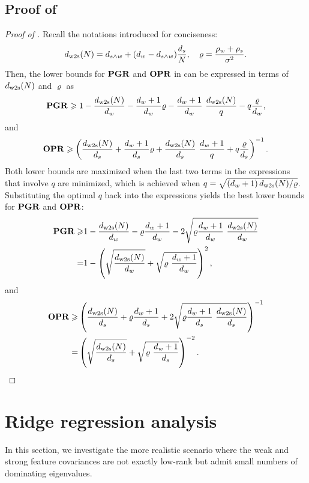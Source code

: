 \subsection{Proof of }\label{apx:pf_non_monotonic_scaling}
\begin{proof}[Proof of ]
    Recall the notations introduced for conciseness:
    \begin{align*}
        d_{\mathrm{w2s}}(N) = d_{s \wedge w} + (d_w - d_{s \wedge w}) \frac{d_s}{N}, \quad \varrho = \frac{\rho_w + \rho_s}{\sigma^2}.
    \end{align*}
    Then, the lower bounds for $\mathbf{PGR}$ and $\mathbf{OPR}$ in  can be expressed in terms of $d_{\mathrm{w2s}}(N)$ and $\varrho$ as 
    \begin{align*}
        \mathbf{PGR} \geqslant 1 - \frac{d_{\mathrm{w2s}}(N)}{d_w} - \frac{d_w + 1}{d_w} \varrho - \frac{d_w + 1}{d_w}\ \frac{d_{\mathrm{w2s}}(N)}{q} - q \frac{\varrho}{d_w},
    \end{align*}
    and 
    \begin{align*}
        \mathbf{OPR} \geqslant \left(\frac{d_{\mathrm{w2s}}(N)}{d_s} + \frac{d_w + 1}{d_s} \varrho + \frac{d_{\mathrm{w2s}}(N)}{d_s}\ \frac{d_w + 1}{q} + q \frac{\varrho}{d_s}\right)^{-1}.
    \end{align*}
    Both lower bounds are maximized when the last two terms in the expressions that involve $q$ are minimized, which is achieved when $q = \sqrt{\left(d_w + 1\right) {d_{\mathrm{w2s}}(N)}/{\varrho}}$. Substituting the optimal $q$ back into the expressions yields the best lower bounds for $\mathbf{PGR}$ and $\mathbf{OPR}$:
    \begin{align*}
        \pgr \ge &1 - \frac{d_\wts(N)}{d_w} - \varrho \frac{d_w + 1}{d_w} - 2 \sqrt{\varrho \frac{d_w + 1}{d_w}\ \frac{d_\wts(N)}{d_w}} \\
        = &1 - \rbr{\sqrt{\frac{d_\wts(N)}{d_w}} + \sqrt{\varrho\ \frac{d_w + 1}{d_w}}}^2,
    \end{align*}
    and 
    \begin{align*}
        \opr \ge &\rbr{\frac{d_\wts(N)}{d_s} + \varrho \frac{d_w + 1}{d_s} + 2 \sqrt{\varrho \frac{d_w + 1}{d_s}\ \frac{d_\wts(N)}{d_s}}}^{-1} \\
        = &\rbr{\sqrt{\frac{d_\wts(N)}{d_s}} + \sqrt{\varrho\ \frac{d_w + 1}{d_s}}}^{-2}.
    \end{align*}
\end{proof}




\section{Ridge regression analysis}\label{apx:ridge_regression}
In this section, we investigate the more realistic scenario where the weak and strong feature covariances are not exactly low-rank but admit small numbers of dominating eigenvalues. 

